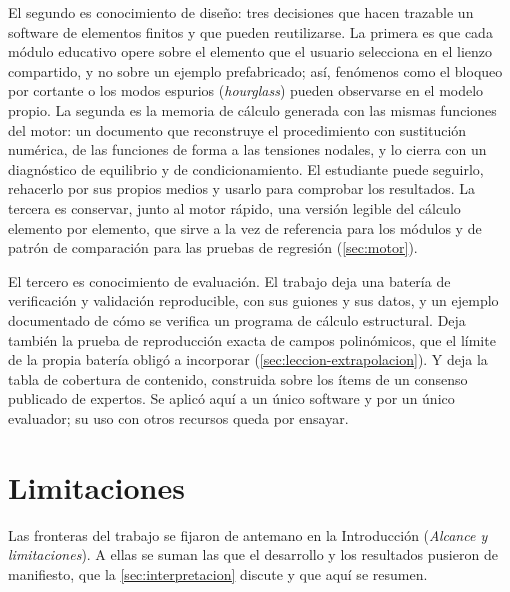 El segundo es conocimiento de diseño: tres decisiones que hacen trazable un software de elementos finitos y que pueden reutilizarse. La primera es que cada módulo educativo opere sobre el elemento que el usuario selecciona en el lienzo compartido, y no sobre un ejemplo prefabricado; así, fenómenos como el bloqueo por cortante o los modos espurios (\emph{hourglass}) pueden observarse en el modelo propio. La segunda es la memoria de cálculo generada con las mismas funciones del motor: un documento que reconstruye el procedimiento con sustitución numérica, de las funciones de forma a las tensiones nodales, y lo cierra con un diagnóstico de equilibrio y de condicionamiento. El estudiante puede seguirlo, rehacerlo por sus propios medios y usarlo para comprobar los resultados. La tercera es conservar, junto al motor rápido, una versión legible del cálculo elemento por elemento, que sirve a la vez de referencia para los módulos y de patrón de comparación para las pruebas de regresión (\autoref{sec:motor}).

El tercero es conocimiento de evaluación. El trabajo deja una batería de verificación y validación reproducible, con sus guiones y sus datos, y un ejemplo documentado de cómo se verifica un programa de cálculo estructural. Deja también la prueba de reproducción exacta de campos polinómicos, que el límite de la propia batería obligó a incorporar (\autoref{sec:leccion-extrapolacion}). Y deja la tabla de cobertura de contenido, construida sobre los ítems de un consenso publicado de expertos. Se aplicó aquí a un único software y por un único evaluador; su uso con otros recursos queda por ensayar.

\section*{Limitaciones}

Las fronteras del trabajo se fijaron de antemano en la Introducción (\emph{Alcance y limitaciones}). A ellas se suman las que el desarrollo y los resultados pusieron de manifiesto, que la \autoref{sec:interpretacion} discute y que aquí se resumen.

